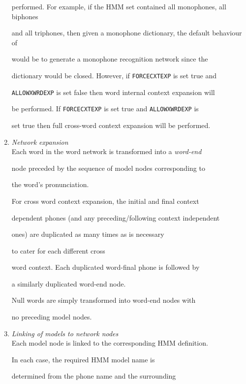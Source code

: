 \begin{enumerate}
performed. For example, if the HMM set contained all monophones, all biphones


and all triphones, then given a monophone dictionary, the default behaviour of


 would be to generate a monophone recognition network since the


dictionary would be closed.  However, if \texttt{FORCECXTEXP} is set true and


\texttt{ALLOWXWRDEXP} is set false then word internal context expansion will 


be performed.  If \texttt{FORCECXTEXP} is set true and \texttt{ALLOWXWRDEXP} is


set true then full cross-word context expansion will be performed.





\item \textit{Network expansion} \\


Each word in the word network is transformed into a \textit{word-end} 


node preceded by the sequence of model nodes corresponding to


the word's pronunciation.


For cross word context expansion, the initial and final context 


dependent phones (and any preceding/following context independent


ones) are duplicated as many times as is necessary


to cater for each different cross


word context.  Each duplicated word-final phone is followed by


a similarly duplicated word-end node.


Null words are simply transformed into word-end nodes with


no preceding model nodes.


   


\item \textit{Linking of models to network nodes} \\


Each model node is linked to the corresponding HMM definition.


In each case, the required HMM model name is 


determined from the phone name and the surrounding



\end{enumerate}
